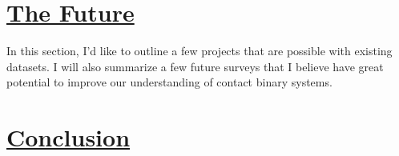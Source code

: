 \documentclass[12pt]{article} %
\numberwithin{equation}{section} %
\begin{document}
\citep{bradstreet1988mapping}


\section[The Future]{\hyperlink{toc}{The Future}}

In this section, I'd like to outline a few projects that are possible with existing datasets. I will also summarize a few future surveys that I believe have great potential to improve our understanding of contact binary systems.




\section[Conclusion]{\hyperlink{toc}{Conclusion}}


\appendix


\newpage

\printindex



\end{document}
